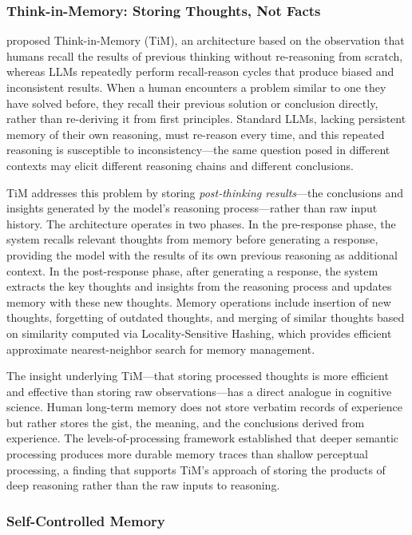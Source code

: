 \subsubsection{Think-in-Memory: Storing Thoughts, Not Facts}

\citet{liu2023thinkinmemory} proposed Think-in-Memory (TiM), an architecture based on the observation that humans recall the results of previous thinking without re-reasoning from scratch, whereas LLMs repeatedly perform recall-reason cycles that produce biased and inconsistent results. When a human encounters a problem similar to one they have solved before, they recall their previous solution or conclusion directly, rather than re-deriving it from first principles. Standard LLMs, lacking persistent memory of their own reasoning, must re-reason every time, and this repeated reasoning is susceptible to inconsistency---the same question posed in different contexts may elicit different reasoning chains and different conclusions.

TiM addresses this problem by storing \emph{post-thinking results}---the conclusions and insights generated by the model's reasoning process---rather than raw input history. The architecture operates in two phases. In the pre-response phase, the system recalls relevant thoughts from memory before generating a response, providing the model with the results of its own previous reasoning as additional context. In the post-response phase, after generating a response, the system extracts the key thoughts and insights from the reasoning process and updates memory with these new thoughts. Memory operations include insertion of new thoughts, forgetting of outdated thoughts, and merging of similar thoughts based on similarity computed via Locality-Sensitive Hashing, which provides efficient approximate nearest-neighbor search for memory management.

The insight underlying TiM---that storing processed thoughts is more efficient and effective than storing raw observations---has a direct analogue in cognitive science. Human long-term memory does not store verbatim records of experience but rather stores the gist, the meaning, and the conclusions derived from experience. The levels-of-processing framework \citep{craik1972levels} established that deeper semantic processing produces more durable memory traces than shallow perceptual processing, a finding that supports TiM's approach of storing the products of deep reasoning rather than the raw inputs to reasoning.

\subsubsection{Self-Controlled Memory}

